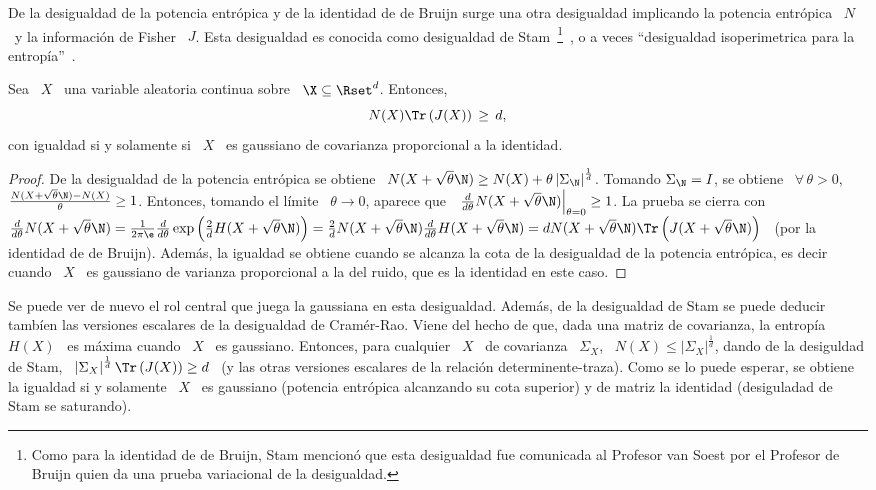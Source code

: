 
\label{Sssec:SZ:Stam}


De la  desigualdad de  la potencia entr\'opica  y de  la identidad de  de Bruijn
surge  una otra  desigualdad implicando  la potencia  entr\'opica \  $N$ \  y la
informaci\'on de Fisher \ $J$.  Esta desigualdad es conocida como desigualdad de
Stam~\footnote{Como para  la identidad  de de Bruijn,  Stam mencion\'o  que esta
  desigualdad fue  comunicada al  Profesor van Soest  por el Profesor  de Bruijn
  quien  da una  prueba variacional  de la  desigualdad.}~\cite{CovTho06, Rio07,
  Sta59},     o    a    veces     ``desigualdad    isoperimetrica     para    la
entrop\'ia''~\cite{WanMad04}.
%
\begin{teorema}
\label{Teo:SZ:Stam}
%
  Sea  \  $X$   \  una  variable  aleatoria  continua   sobre  \  $\X  \subseteq
  \Rset^d$. Entonces,
  \[
  N(X) \Tr\left( J(X) \right) \, \ge \, d,
  \]
  con igualdad si y solamente si \ $X$ \ es gaussiano de covarianza proporcional
  a la identidad.
\end{teorema}
%
\begin{proof}
  De la desigualdad de la potencia entr\'opica se obtiene \ $N(X + \sqrt{\theta}
  \N)  \ge N(X)  + \theta  \left| \Sigma_\N  \right|^{\frac1d}$. Tomando
  $\Sigma_\N =  I$, se  obtiene \ $\forall  \, \theta  > 0,$ \  $\frac{N(X +
    \sqrt{\theta} \N) - N(X)}{\theta}  \ge 1$.  Entonces, tomando el l\'imite
  \ $\theta \to 0$, aparece  que \ $\left. \frac{d}{d\theta} N(X + \sqrt{\theta}
    \N)   \right|_{\theta  =   0}  \ge   1$.   La   prueba  se   cierra  con
  $\frac{d}{d\theta}  N(X   +  \sqrt{\theta}   \N)  =  \frac{1}{2   \pi  \e}
  \frac{d}{d\theta}  \exp\left( \frac2d  H(X +  \sqrt{\theta} \N)  \right) =
  \frac2d  N(X +  \sqrt{\theta}  \N) \frac{d}{d\theta}  H(X +  \sqrt{\theta}
  \N) = d N(X +  \sqrt{\theta} \N) \Tr\left( J(X + \sqrt{\theta} \N)
  \right)$ \ (por la identidad de  de Bruijn).  Adem\'as, la igualdad se obtiene
  cuando se  alcanza la cota  de la desigualdad  de la potencia  entr\'opica, es
  decir cuando \ $X$ \ es gaussiano de varianza proporcional a la del ruido, que
  es la identidad en este caso.
\end{proof}
%
Se  puede  ver  de  nuevo  el  rol  central  que  juega  la  gaussiana  en  esta
desigualdad. Adem\'as, de la desigualdad  de Stam se puede deducir tamb\'ien las
versiones escalares de  la desigualdad de Cram\'er-Rao. Viene  del hecho de que,
dada una matriz de covarianza, la entrop\'ia \ $H(X)$ \ es m\'axima cuando \ $X$
\ es gaussiano.  Entonces, para cualquier  \ $X$ \ de covarianza \ $\Sigma_X$, \
$N(X) \le \left| \Sigma_X \right|^{\frac1d}$,  dando de la desiguldad de Stam, \
$\left| \Sigma_X \right|^{\frac1d} \Tr\left( J(X)  \right) \ge d$ \ (y las otras
versiones  escalares de  la relaci\'on  determinente-traza).  Como  se  lo puede
esperar, se  obtiene la igualdad si y  solamente \ $X$ \  es gaussiano (potencia
entr\'opica alcanzando su  cota superior) y de matriz  la identidad (desiguladad
de Stam se saturando).

